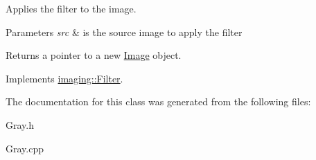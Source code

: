 Applies the filter to the image.


\begin{DoxyParams}{Parameters}
{\em src} & is the source image to apply the filter\\
\hline
\end{DoxyParams}
\begin{DoxyReturn}{Returns}
a pointer to a new \hyperlink{classimaging_1_1_image}{Image} object. 
\end{DoxyReturn}


Implements \hyperlink{classimaging_1_1_filter_ab153f2e4e89dd744806299a29da8289b}{imaging\+::\+Filter}.



The documentation for this class was generated from the following files\+:\begin{DoxyCompactItemize}
\item 
Gray.\+h\item 
Gray.\+cpp\end{DoxyCompactItemize}
